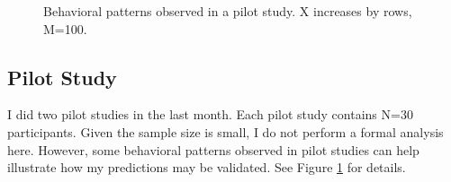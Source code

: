 \documentclass[
  12pt,
]{article}
\begin{document}
\begin{figure}
  \centering
  \caption{Behavioral patterns observed in a pilot study. X increases by rows, M=100.}
  \label{fig:pilot-result}
\end{figure}

\hypertarget{pilot-study}{%
\subsection{Pilot Study}\label{pilot-study}}

I did two pilot studies in the last month. Each pilot study contains
N=30 participants. Given the sample size is small, I do not perform a
formal analysis here. However, some behavioral patterns observed in
pilot studies can help illustrate how my predictions may be validated.
See Figure \ref{fig:pilot-result} for details.
\end{document}
